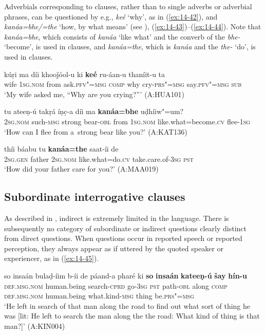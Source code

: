 Adverbials corresponding to clauses, rather than to single adverbs or adverbial phrases, can be questioned by e.g., \textit{keé} `why', as in (\ref{ex:14-42}), and \textit{kanáa=bhe/=the} `how, by what means' (see ), (\ref{ex:14-43})--(\ref{ex:14-44}). Note that \textit{kanáa=bhe}, which consists of \textit{kanáa} `like what' and the converb of the  \textit{bhe-} `become', is used in  clauses, and \textit{kanáa=the}, which is \textit{kanáa} and the  \textit{the-} `do', is used in  clauses.

\begin{exe}
\ex
\label{ex:14-42}
\gll kúṛi ma díi khooǰóol-u ki \textbf{keé} ru-áan-u thaníit-u ta\\
wife \textsc{1sg.nom} from ask.\textsc{pfv"=msg} \textsc{comp} why  cry-\textsc{prs"=msg} say.\textsc{pfv"=msg} \textsc{sub}\\
\glt `My wife asked me, ``Why are you crying?''' (A:HUA101)

\ex
\label{ex:14-43}
\gll tu ateeṇ-ú takṛá íṇc̣-a díi ma \textbf{kanáa=bhe} uḍhíiw"=um? \\
\textsc{2sg.nom} such-\textsc{msg} strong bear-\textsc{obl} from \textsc{1sg.nom}  like.what=become.\textsc{cv} flee-\textsc{1sg} \\
\glt `How can I flee from a~strong bear like you?' (A:KAT136)

\ex
\label{ex:14-44}
\gll thíi báabu tu \textbf{kanáa=the} saat-íi de \\
\textsc{2sg.gen} father \textsc{2sg.nom} like.what=do.\textsc{cv} take.care.of-\textsc{3sg} \textsc{pst} \\
\glt `How did your father care for you?' (A:MAA019)
\end{exe}

\subsection{Subordinate {interrogative} clauses}
\label{subsec:14-2-3}


As described in , indirect  is extremely limited in the language. There is subsequently no category of subordinate or indirect questions clearly distinct from direct questions. When questions occur in reported speech or reported perception, they always appear as if uttered by the quoted speaker or experiencer, as in (\ref{ex:14-45}).

\begin{exe}
\ex
\label{ex:14-45}
\gll so insaán bulaḍ-íim b-íi de páand-a pharé ki \textbf{so} \textbf{insaán} \textbf{kateeṇ-ú} \textbf{šay} \textbf{hín-u}\\
\textsc{def.msg.nom} human.being search-\textsc{cprd} go-\textsc{3sg} \textsc{pst} path-\textsc{obl} along \textsc{comp} \textsc{def.msg.nom} human.being what.kind-\textsc{msg} thing be.\textsc{prs"=msg}\\
\glt `He left in search of that man along the road to find out what sort of thing he was [lit: He left to search the man along the the road: What kind of thing is that man?]' (A:KIN004)
\end{exe}

